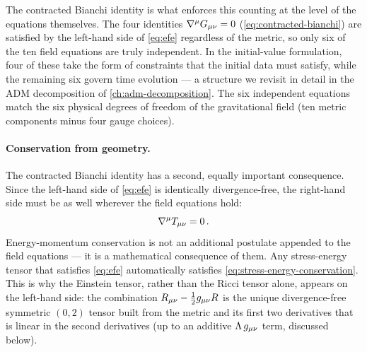 The contracted Bianchi identity is what enforces this counting at the level
of the equations themselves.  The four identities
$\nabla^\mu G_{\mu\nu} = 0$ (\cref{eq:contracted-bianchi}) are satisfied by
the left-hand side of \cref{eq:efe} regardless of the metric, so only six
of the ten field equations are truly independent.  In the initial-value
formulation, four of these take the form of constraints that the initial data
must satisfy, while the remaining six govern time evolution --- a structure
we revisit in detail in the ADM decomposition of
\cref{ch:adm-decomposition}.  The six independent equations match the six
physical degrees of freedom of the gravitational field (ten metric components
minus four gauge choices).

\paragraph{Conservation from geometry.}

The contracted Bianchi identity has a second, equally important
consequence.  Since the left-hand side of \cref{eq:efe} is identically
divergence-free, the right-hand side must be as well wherever the field
equations hold:
%
\begin{equation}
  \nabla^\mu T_{\mu\nu} = 0 \,.
  \label{eq:stress-energy-conservation}
\end{equation}
%
Energy-momentum conservation is not an additional postulate appended to the
field equations --- it is a mathematical consequence of them.  Any
stress-energy tensor that satisfies \cref{eq:efe} automatically satisfies
\cref{eq:stress-energy-conservation}.  This is why the Einstein tensor,
rather than the Ricci tensor alone, appears on the left-hand side: the
combination $R_{\mu\nu} - \tfrac{1}{2}g_{\mu\nu}R$ is the unique
divergence-free symmetric $(0,2)$ tensor built from the metric and its first
two derivatives that is linear in the second derivatives (up to an additive
$\Lambda\,g_{\mu\nu}$ term, discussed below).

